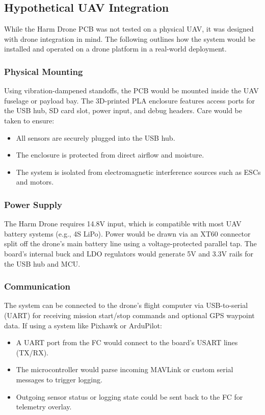 \documentclass[../main.tex]{subfiles}
\begin{document}
\subsection{Hypothetical UAV Integration}

While the Harm Drone PCB was not tested on a physical UAV, it was designed with drone integration in mind. The following outlines how the system would be installed and operated on a drone platform in a real-world deployment.

\subsubsection{Physical Mounting}
Using vibration-dampened standoffs, the PCB would be mounted inside the UAV fuselage or payload bay. The 3D-printed PLA enclosure features access ports for the USB hub, SD card slot, power input, and debug headers. Care would be taken to ensure:

\begin{itemize}
    \item All sensors are securely plugged into the USB hub.
    \item The enclosure is protected from direct airflow and moisture.
    \item The system is isolated from electromagnetic interference sources such as ESCs and motors.
\end{itemize}

\subsubsection*{Power Supply}
The Harm Drone requires 14.8V input, which is compatible with most UAV battery systems (e.g., 4S LiPo). Power would be drawn via an XT60 connector split off the drone’s main battery line using a voltage-protected parallel tap. The board's internal buck and LDO regulators would generate 5V and 3.3V rails for the USB hub and MCU.

\subsubsection{Communication}
The system can be connected to the drone’s flight computer via USB-to-serial (UART) for receiving mission start/stop commands and optional GPS waypoint data. If using a system like Pixhawk or ArduPilot:

\begin{itemize}
    \item A UART port from the FC would connect to the board’s USART lines (TX/RX).
    \item The microcontroller would parse incoming MAVLink or custom serial messages to trigger logging.
    \item Outgoing sensor status or logging state could be sent back to the FC for telemetry overlay.
\end{itemize}
\end{document}
